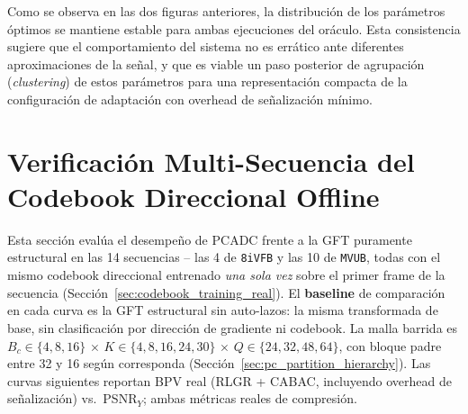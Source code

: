 Como se observa en las dos figuras anteriores, la distribución de los parámetros óptimos se
mantiene estable para ambas ejecuciones del oráculo. Esta consistencia sugiere que el
comportamiento del sistema no es errático ante diferentes aproximaciones de la señal, y que es
viable un paso posterior de agrupación (\textit{clustering}) de estos parámetros para una
representación compacta de la configuración de adaptación con overhead de señalización mínimo.

\section{Verificación Multi-Secuencia del Codebook Direccional Offline}
\label{sec:resultados_e10}

Esta sección evalúa el desempeño de PCADC frente a la GFT puramente estructural en las 14
secuencias -- las 4 de \texttt{8iVFB} y las 10 de \texttt{MVUB}, todas con el
mismo codebook direccional entrenado \emph{una sola vez} sobre el primer frame de la secuencia
(Sección~\ref{sec:codebook_training_real}). El \textbf{baseline} de comparación en cada curva es
la GFT estructural sin auto-lazos: la misma transformada de base, sin clasificación por
dirección de gradiente ni codebook. La malla barrida es $B_c\in\{4,8,16\}$ $\times$ $K\in\{4,8,16,24,30\}$ $\times$ $Q\in\{24,32,48,64\}$, con bloque padre entre 32 y 16 según corresponda
(Sección~\ref{sec:pc_partition_hierarchy}). Las curvas siguientes reportan BPV real (RLGR + CABAC, incluyendo
overhead de señalización) vs.\ PSNR$_Y$; ambas métricas reales de compresión.

